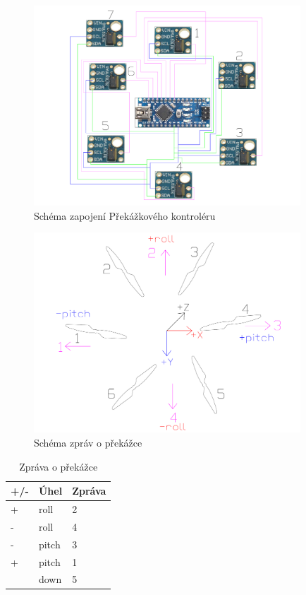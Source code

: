 \begin{figure}[H]
	\centering
	\includegraphics[width=10cm]{pictures/obstacle.pdf}
	\caption{Schéma zapojení Překážkového kontroléru}
\end{figure}

\begin{figure}[H]
	\centering
	\includegraphics[width=10cm]{pictures/obstacle_teo.pdf}
	\caption{Schéma zpráv o překážce}
\end{figure}

\begin{table}[H]
	\centering
	\begin{tabular}{|l|l|l|}
		\hline
		\textbf{+/-} & \textbf{Úhel} & \textbf{Zpráva} \\ \hline
		+            & roll          & 2               \\ \hline
		-            & roll          & 4               \\ \hline
		-            & pitch         & 3               \\ \hline
		+            & pitch         & 1               \\ \hline
		& down          & 5               \\ \hline
	\end{tabular}
	\caption{Zpráva o překážce}
\end{table}


